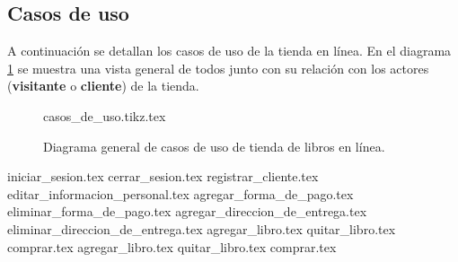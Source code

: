 %
%

\subsection{Casos de uso}

A continuación se detallan los casos de uso de la tienda en línea. En el
diagrama \ref{lib_casos_de_uso_general} se muestra una vista
general de todos junto con su relación con los actores (\textbf{visitante} o
\textbf{cliente}) de la tienda.

\begin{figure}
  \begin{center}
    {casos_de_uso.tikz.tex}
    \caption{Diagrama general de casos de uso de tienda de libros en línea.}
    \label{lib_casos_de_uso_general}
  \end{center}
\end{figure}

{iniciar_sesion.tex}
{cerrar_sesion.tex}
{registrar_cliente.tex}
{editar_informacion_personal.tex}
{agregar_forma_de_pago.tex}
{eliminar_forma_de_pago.tex}
{agregar_direccion_de_entrega.tex}
{eliminar_direccion_de_entrega.tex}
{agregar_libro.tex}
{quitar_libro.tex}
{comprar.tex}
{agregar_libro.tex}
{quitar_libro.tex}
{comprar.tex}
